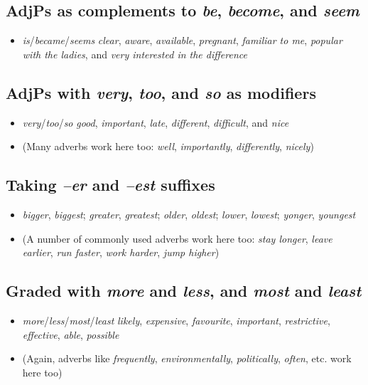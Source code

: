 \subsection*{AdjPs as complements to \textit{be}, \textit{become}, and \textit{seem}}
\begin{itemize}[noitemsep]
    \item \textit{is}/\textit{became}/\textit{seems} \textit{clear},  \textit{aware}, \textit{available}, \textit{pregnant},  \textit{familiar to me},  \textit{popular with the ladies}, and \textit{very interested in the difference}
\end{itemize}

\subsection*{AdjPs with \textit{very}, \textit{too}, and \textit{so} as modifiers}
\begin{itemize}[noitemsep]
    \item \textit{very}/\textit{too}/\textit{so} \textit{good}, \textit{important}, \textit{late}, \textit{different}, \textit{difficult}, and \textit{nice}
    \item(Many adverbs work here too: \textit{well}, \textit{importantly}, \textit{differently}, \textit{nicely})
\end{itemize}

\subsection*{Taking \textit{--er} and \textit{--est} suffixes}
\begin{itemize}[noitemsep]
    \item \textit{bigger}, \textit{biggest}; \textit{greater}, \textit{greatest}; \textit{older}, \textit{oldest}; \textit{lower}, \textit{lowest}; \textit{yonger}, \textit{youngest}
    \item (A number of commonly used adverbs work here too: \textit{stay longer}, \textit{leave earlier}, \textit{run faster}, \textit{work harder}, \textit{jump higher})
\end{itemize}

\subsection*{Graded with \textit{more} and \textit{less}, and \textit{most} and \textit{least}}
\begin{itemize}[noitemsep]
    \item \textit{more}/\textit{less}/\textit{most}/\textit{least} \textit{likely}, \textit{expensive}, \textit{favourite}, \textit{important}, \textit{restrictive}, \textit{effective}, \textit{able}, \textit{possible}
    \item (Again, adverbs like \textit{frequently}, \textit{environmentally}, \textit{politically}, \textit{often}, etc. work here too)
\end{itemize}

